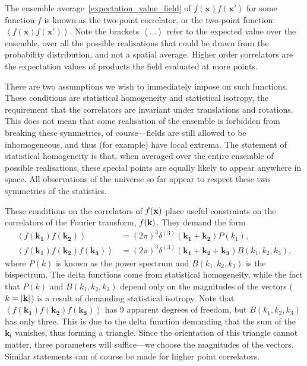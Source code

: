     The ensemble average~\eqref{expectation_value_field} of
    $f(\mathbf{x})f(\mathbf{x'})$ for some function $f$ is known as the
    two-point correlator, or the two-point function: $\left<f(\mathbf{x})f(\mathbf{x'})\right>$.
    Note the brackets $\left<\ldots\right>$ refer to the expected value over the ensemble,
    over all the possible realisations that could be drawn from the probability
    distribution, and not a spatial average.
    Higher order correlators are the
    expectation values of products the field evaluated at more points.


    There are two assumptions we wish to immediately impose on such functions.
    Those conditions are statistical homogeneity and statistical isotropy,
    the requirement that the correlators are invariant under translations and rotations.
    This does not mean that some realisation of the ensemble is forbidden from
    breaking these symmetries, of course---fields
    are still allowed to be inhomogeneous, and thus (for example) have local extrema.
    The statement of statistical homogeneity is that,
    when averaged over the entire ensemble of possible realisations, these special points
    are equally likely to appear anywhere in space.
    All observations of the universe so far appear to respect these two symmetries of the statistics.


    These conditions on the correlators of $f(\mathbf{x})$ place useful constraints on the correlators of the
    Fourier transform, $f(\mathbf{k})$. They demand the form
    \begin{align}\label{spectrum_definitions}
        \left<f(\mathbf{k_1})f(\mathbf{k_2})\right> &= (2\pi)^3\delta^{(3)}(\mathbf{k_1}+\mathbf{k_2})P(k_1),\\
        \left<f(\mathbf{k_1})f(\mathbf{k_2})f(\mathbf{k_3})\right> &= (2\pi)^3\delta^{(3)}(\mathbf{k_1}+\mathbf{k_2}+\mathbf{k_3})B(k_1,k_2,k_3),
    \end{align}
    where $P(k)$ is known as the power spectrum and $B(k_1,k_2,k_3)$ is the bispectrum.
    The delta functions come from statistical homogeneity, while the fact that $P(k)$
    and $B(k_1,k_2,k_3)$ depend only on the magnitudes of the vectors ($k=\left|\mathbf{k}\right|$) is a result
    of demanding statistical isotropy.
    Note that $\left<f(\mathbf{k_1})f(\mathbf{k_2})f(\mathbf{k_3})\right>$
    has $9$ apparent degrees of freedom, but $B(k_1,k_2,k_3)$ has only three.
    This is due to the delta function
    demanding that the sum of the $\mathbf{k_i}$ vanishes, thus forming a triangle.
    Since the orientation of this triangle
    cannot matter, three parameters will suffice---we choose the magnitudes of the vectors.
    Similar statements can of course be made for higher point correlators.


